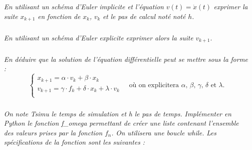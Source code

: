 \documentclass[10pt]{article}
\newif\ifprof
\begin{document}
\subparagraph{}
\textit{En utilisant un schéma d'Euler implicite et l'équation $v(t) = \dot{x}(t)$ 
exprimer la suite $x_{k+1}$ en fonction de $x_k$, $v_k$ et le pas de calcul noté noté $h$.}

\ifprof
\begin{corrige}
On a $\dfrac{dx(t)}{dt} \simeq \dfrac{x_{k}-x_ {k-1}}{h}$. On a donc 
$v_k = \dfrac{x_{k}-x_{k-1}}{h} \Longleftrightarrow x_{k} = h\cdot v_k + x_{k-1}$.
\end{corrige}
\else
\fi



\subparagraph{}
\textit{En utilisant un schéma d'Euler explicite exprimer alors la suite $v_{k+1}$.}

\ifprof
\begin{corrige}
On a $\dfrac{dv(t)}{dt} \simeq \dfrac{v_{k+1}-v_k}{h}$.  En conséquences, 
$m\cdot\dot{v}(t)+c\cdot {v}(t) + k\cdot x(t) = f(t)$
peut donc se mettre sous la forme suivante :

$$
m\cdot\dfrac{v_{k+1}-v_k}{h}+c\cdot {v_k} + k\cdot x_k = f_k
\Longleftrightarrow 
m\cdot {v_{k+1}}  = f_k h - kh\cdot x_k - c h\cdot {v_k}+v_k
\Longleftrightarrow
 {v_{k+1}}  = \dfrac{h}{m} f_k - \dfrac{kh}{m}x_k +\dfrac{1-ch}{m}v_k
$$
\end{corrige}
\else
\fi

\subparagraph{}
\textit{En déduire que la solution de l'équation différentielle peut se mettre sous la forme :
$$
\left\{
\begin{array}{l}
x_{k+1} = \alpha \cdot v_k + \beta \cdot x_k \\
v_{k+1} = \gamma \cdot f_k + \delta  \cdot x_k  + \lambda\cdot v_k \\
\end{array}
\right.
\quad \text{où on explicitera $\alpha$, $\beta$, $\gamma$, $\delta$ et $\lambda$.}
$$
}

\ifprof
\begin{corrige}
Dans ses conditions, on a : 
$$
\alpha  = h \quad \beta = 1 \quad \gamma =\dfrac{h}{m} \quad \delta = -\dfrac{kh}{m} \quad \lambda = \dfrac{1-ch}{m}
$$
\end{corrige}
\else
\fi




\subparagraph{}
\textit{On note \textsf{Tsimu} le temps de simulation et \textsf{h} le pas de temps. Implémenter en Python le fonction \textsf{f\_omega} 
permettant de créer une liste contenant l'ensemble des valeurs prises par la fonction $f_n$. On utilisera une boucle \textsf{while}. Les spécifications de la fonction sont les suivantes : }
\end{document}
